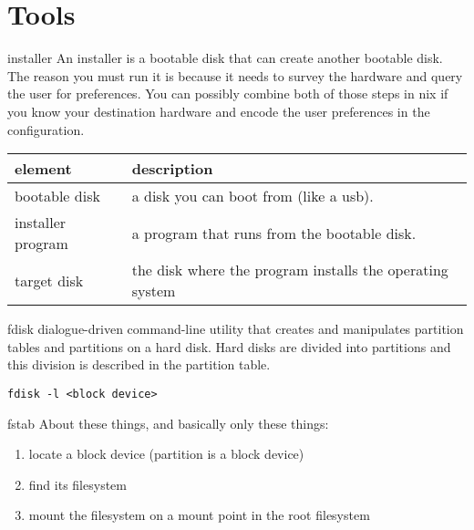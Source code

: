 \documentclass[openany, 12pt]{book}
\begin{document}
\chapter{Tools}
\begin{definition}{installer}{}
	An installer is a bootable disk that can create another bootable disk.  The
	reason you must run it is because it needs to survey the hardware and query
	the user for preferences. You can possibly combine both of those steps in
	nix if you know your destination hardware and encode the user preferences in
	the configuration.

	\begin{center}
		\begin{tabular}{ll}
			\toprule
			element           & description                                              \\
			\midrule
			bootable disk     & a disk you can boot from (like a usb).                   \\
			installer program & a program that runs from the bootable disk.              \\
			target disk       & the disk where the program installs the operating system \\
			\bottomrule
		\end{tabular}
	\end{center}
\end{definition}

\begin{definition}{fdisk}{}
	dialogue-driven command-line utility that creates and manipulates partition
	tables and partitions on a hard disk. Hard disks are divided into partitions
	and this division is described in the partition table.
	\begin{verbatim}
fdisk -l <block device>
    \end{verbatim}
\end{definition}

\begin{definition}{fstab}{}
	About these things, and basically only these things:
	\begin{enumerate}[label = {(\arabic*)}]
		\item locate a block device (partition is a block device)
		\item find its filesystem
		\item mount the filesystem on a mount point in the root filesystem
	\end{enumerate}
\end{definition}
\end{document}
